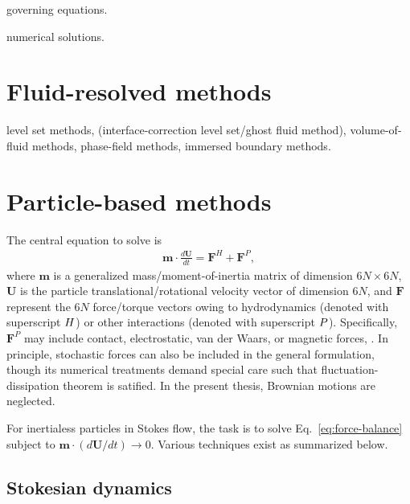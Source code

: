 governing equations.

numerical solutions.



\section{Fluid-resolved methods}

level set methods,
(interface-correction level set/ghost fluid method),
volume-of-fluid methods,
phase-field methods,
immersed boundary methods.


\section{Particle-based methods}

The central equation to solve is
\begin{equation} 
 \begin{aligned} \label{eq:force-balance}
  {\bm m} \cdot \frac{d{\bm U}}{dt} = {\bm F}^H + {\bm F}^P, 
 \end{aligned}
\end{equation}
where ${\bm m}$ is a generalized mass/moment-of-inertia matrix of dimension $6N \times 6N$,
${\bm U}$ is the particle translational/rotational velocity vector of dimension $6N$,
and ${\bm F}$ represent the $6N$ force/torque vectors owing to hydrodynamics (denoted with superscript $\footnotesize H$) or other interactions (denoted with superscript $\footnotesize P$). Specifically, ${\bm F}^P$ may include contact, electrostatic, van der Waars, or magnetic forces, \etc. In principle, stochastic forces can also be included in the general formulation, though its numerical treatments demand special care such that fluctuation-dissipation theorem is satified. In the present thesis, Brownian motions are neglected.

For inertialess particles in Stokes flow, the task is to solve Eq.\ \eqref{eq:force-balance} subject to ${\bm m} \cdot (d{\bm U}/dt) \to 0$. Various techniques exist as summarized below.

\subsection{Stokesian dynamics}

